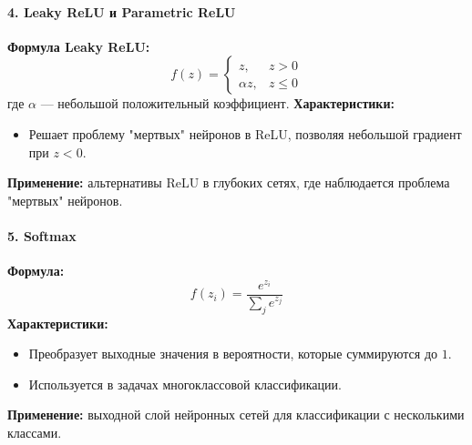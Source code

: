 {\paragraph{4. Leaky ReLU и Parametric ReLU}
\textbf{Формула Leaky ReLU:}
\[
    f(z) =
    \begin{cases}
        z,        & z > 0    \\
        \alpha z, & z \leq 0
    \end{cases}
\]
где $\alpha$ — небольшой положительный коэффициент.
\textbf{Характеристики:}
\begin{itemize}
    \item Решает проблему "мертвых" нейронов в ReLU, позволяя небольшой градиент при $z < 0$.
\end{itemize}
\textbf{Применение:} альтернативы ReLU в глубоких сетях, где наблюдается проблема "мертвых" нейронов.

\paragraph{5. Softmax}
\textbf{Формула:}
\[
    f(z_i) = \frac{e^{z_i}}{\sum_{j} e^{z_j}}
\]
\textbf{Характеристики:}
\begin{itemize}
    \item Преобразует выходные значения в вероятности, которые суммируются до $1$.
    \item Используется в задачах многоклассовой классификации.
\end{itemize}
\textbf{Применение:} выходной слой нейронных сетей для классификации с несколькими классами.

}
